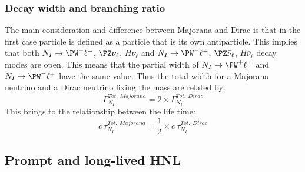 \subsubsection{Decay width and branching ratio}
The main consideration and difference between Majorana and Dirac is that in the first case \hnl particle is defined as a particle that is its own antiparticle. This implies that both $N_I\rightarrow \PW^{+}\ell^-$, $\PZ\nu_{\ell}$, $H\nu_{\ell}$ and $N_I\rightarrow \PW^{-}\ell^+$, $\PZ\bar{\nu}_{\ell}$, $H\bar{\nu}_{\ell}$ decay modes are open. This means that the partial width of $N_I\rightarrow \PW^{+}\ell^-$ and $N_I\rightarrow \PW^{-}\ell^+$ have the same value. Thus the total width for a Majorana neutrino and a Dirac neutrino fixing the mass are related by:
\begin{equation}
\label{eq:width}
\Gamma^{Tot, \: Majorana}_{N_{I}} = 2 \times \Gamma^{Tot, \: Dirac}_{N_{I}}
\end{equation}
This brings to the relationship between the life time:
\begin{equation}
\label{eq:lifetime}
c\:\tau^{Tot, \: Majorana}_{N_{I}} = \frac{1}{2} \times c\:\tau^{Tot, \: Dirac}_{N_{I}}
\end{equation}

\subsection{Prompt and long-lived HNL}\label{sec:promptll}

